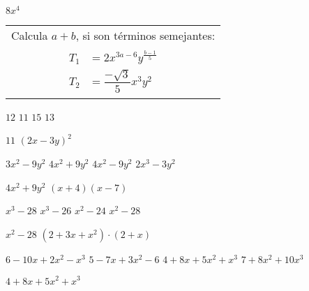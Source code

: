 $8x^4$
\begin{tabular}{c}
	Calcula $a+b$, si son t\'erminos semejantes: \\
	$\begin{aligned}
		T_1&=2x^{3a-6}y^{\frac{b-1}{5}} \\
		T_2&=\dfrac{-\sqrt{3}}{5}x^3y^2
	\end{aligned}$
\end{tabular}
\begin{enum}
	\ii $12$
	\ii $11$
	\ii $15$
	\ii $13$
\end{enum}
$11$
$(2x-3y)^2$
\begin{enum}
	\ii $3x^2-9y^2$
	\ii $4x^2+9y^2$
	\ii $4x^2-9y^2$
	\ii $2x^3-3y^2$
\end{enum}
$4x^2+9y^2$
$(x+4)(x-7)$
\begin{enum}
	\ii $x^3-28$
	\ii $x^3-26$
	\ii $x^2-24$
	\ii $x^2-28$
\end{enum}
$x^2-28$
$\left(2+3x+x^2\right)\cdot(2+x)$
\begin{enum}
	\ii $6-10x+2x^2-x^3$
	\ii $5-7x+3x^2-6$
	\ii $4+8x+5x^2+x^3$
	\ii $7+8x^2+10x^3$
\end{enum}
$4+8x+5x^2+x^3$
